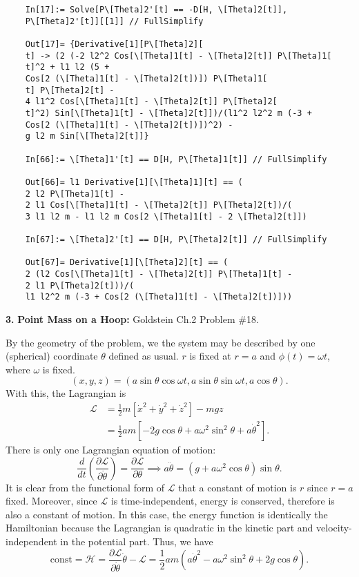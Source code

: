 \documentclass{article}
\theoremstyle{definition}
\newcommand{\p}{\partial}
\newcommand{\lag}{\mathcal{L}}
\newcommand{\ham}{\mathcal{H}}
\newcommand{\f}[2]{\frac{#1}{#2}}
\newcommand{\lp}{\left(}
\newcommand{\rp}{\right)}
\newcommand{\lb}{\left[}
\newcommand{\rb}{\right]}
\begin{document}
\begin{enumerate}[label=(\alph*)]
\begin{lstlisting}
	In[17]:= Solve[P\[Theta]2'[t] == -D[H, \[Theta]2[t]], 
	P\[Theta]2'[t]][[1]] // FullSimplify
	
	Out[17]= {Derivative[1][P\[Theta]2][
	t] -> (2 (-2 l2^2 Cos[\[Theta]1[t] - \[Theta]2[t]] P\[Theta]1[
	t]^2 + l1 l2 (5 + 
	Cos[2 (\[Theta]1[t] - \[Theta]2[t])]) P\[Theta]1[
	t] P\[Theta]2[t] - 
	4 l1^2 Cos[\[Theta]1[t] - \[Theta]2[t]] P\[Theta]2[
	t]^2) Sin[\[Theta]1[t] - \[Theta]2[t]])/(l1^2 l2^2 m (-3 + 
	Cos[2 (\[Theta]1[t] - \[Theta]2[t])])^2) - 
	g l2 m Sin[\[Theta]2[t]]}
	
	In[66]:= \[Theta]1'[t] == D[H, P\[Theta]1[t]] // FullSimplify
	
	Out[66]= l1 Derivative[1][\[Theta]1][t] == (
	2 l2 P\[Theta]1[t] - 
	2 l1 Cos[\[Theta]1[t] - \[Theta]2[t]] P\[Theta]2[t])/(
	3 l1 l2 m - l1 l2 m Cos[2 \[Theta]1[t] - 2 \[Theta]2[t]])
	
	In[67]:= \[Theta]2'[t] == D[H, P\[Theta]2[t]] // FullSimplify
	
	Out[67]= Derivative[1][\[Theta]2][t] == (
	2 (l2 Cos[\[Theta]1[t] - \[Theta]2[t]] P\[Theta]1[t] - 
	2 l1 P\[Theta]2[t]))/(
	l1 l2^2 m (-3 + Cos[2 (\[Theta]1[t] - \[Theta]2[t])]))
	\end{lstlisting}
\end{enumerate}




\newpage
\noindent \textbf{3.} \textbf{Point Mass on a Hoop:} Goldstein Ch.2 Problem \#18. 

By the geometry of the problem, we the system may be described by one (spherical) coordinate $\theta$ defined as usual. $r$ is fixed at $r=a$ and $\phi(t) = \omega t$, where $\omega$ is fixed.
\begin{equation*}
(x,y,z) = (a\sin\theta \cos\omega t, a\sin\theta\sin\omega t, a\cos\theta).
\end{equation*}
With this, the Lagrangian is 
\begin{align*}
\lag 
&= \f{1}{2}m \lb \dot{x}^2 + \dot{y}^2 + \dot{z}^2\rb - mgz\\
&= \f{1}{2} am \lb -2g\cos\theta + a\omega^2\sin^2\theta  + a\dot{\theta}^2 \rb.
\end{align*}
There is only one Lagrangian equation of motion:
\begin{equation*}
\f{d}{dt}\lp \f{\p \lag}{\p \dot\theta} \rp = \f{\p \lag}{\p \theta} \implies a \ddot{\theta} =  \lp g + a\omega^2 \cos\theta \rp\sin\theta.
\end{equation*}
It is clear from the functional form of $\lag$ that a constant of motion is $r$ since $r=a$ fixed. Moreover, since $\lag$ is time-independent, energy is conserved, therefore is also a constant of motion. In this case, the energy function is identically the Hamiltonian because the Lagrangian is quadratic in the kinetic part and velocity-independent in the potential part. Thus, we have
\begin{equation*}
\text{const} = \ham = \f{\p \lag}{\p \dot\theta}\dot\theta - \lag = \frac{1}{2} a m \left(a \dot\theta^2-a \omega^2 \sin^2\theta+2 g \cos\theta\right).
\end{equation*}
\end{document}
